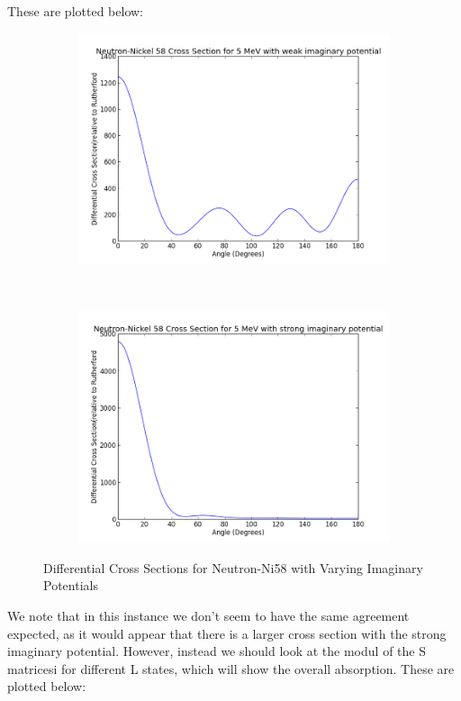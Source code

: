 \documentclass[paper=a4, fontsize=11pt]{scrartcl} %
\numberwithin{equation}{section} %
\numberwithin{figure}{section} %
\numberwithin{table}{section} %
\begin{document}
These are plotted below:

 \begin{figure}[hbt!]
        \centering
        \begin{subfigure}[b!]{0.45\textwidth}
                \includegraphics[width=\textwidth]{NeutronWeakcs.png}
        \end{subfigure}%
        ~ %
\quad
        \begin{subfigure}[b!]{0.45\textwidth}
                \includegraphics[width=\textwidth]{NeutronStrongcs.png}
        \end{subfigure}

        \caption{Differential Cross Sections for Neutron-Ni58 with Varying Imaginary Potentials}
\end{figure}
\newpage
We note that in this instance we don't seem to have the same agreement expected, as it would appear that there is a larger cross section with the strong imaginary potential. However, instead we should look at the modul of the S matricesi for different L states, which will show the overall absorption. These are plotted below:\\
\end{document}
